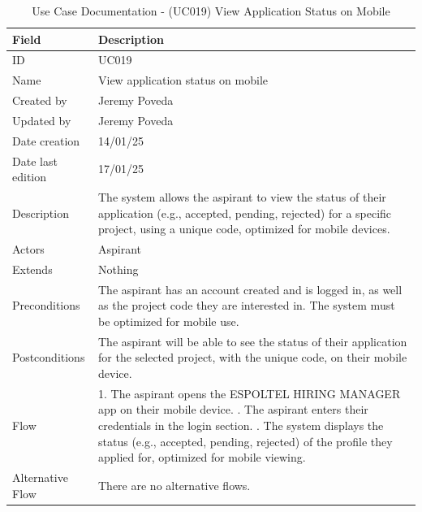 \documentclass{scrreprt}
\begin{document}
\begin{table}[H]
	\centering \small
	\begin{tabular}{|p{3cm}|p{10cm}|}
		\hline
		\textbf{Field} & \textbf{Description} \\ \hline
		ID & UC019 \\ \hline
		Name & View application status on mobile \\ \hline
		Created by & Jeremy Poveda \\ \hline
		Updated by & Jeremy Poveda \\ \hline
		Date creation & 14/01/25 \\ \hline
		Date last edition & 17/01/25 \\ \hline
		Description & The system allows the aspirant to view the status of their application (e.g., accepted, pending, rejected) for a specific project, using a unique code, optimized for mobile devices. \\ \hline
		Actors & Aspirant \\ \hline
		Extends & Nothing \\ \hline
		Preconditions & The aspirant has an account created and is logged in, as well as the project code they are interested in. The system must be optimized for mobile use. \\ \hline
		Postconditions & The aspirant will be able to see the status of their application for the selected project, with the unique code, on their mobile device. \\ \hline
		Flow & 
		1. The aspirant opens the ESPOLTEL HIRING MANAGER app on their mobile device. \newline
		2. The aspirant enters their credentials in the login section. \newline
		5. The system displays the status (e.g., accepted, pending, rejected) of the profile they applied for, optimized for mobile viewing. 
		\\ \hline
		Alternative Flow & There are no alternative flows. \\ \hline
	\end{tabular}
	\caption{Use Case Documentation - (UC019) View Application Status on Mobile}
	\label{table:UC019}
\end{table}
\end{document}
